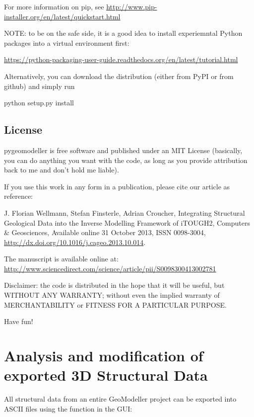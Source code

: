 \documentclass[letterpaper,10pt,english]{sphinxmanual}
\begin{document}
For more information on pip, see
\href{http://www.pip-installer.org/en/latest/quickstart.html}{http://www.pip-installer.org/en/latest/quickstart.html}

NOTE: to be on the safe side, it is a good idea to install experiemntal
Python packages into a virtual environment first:

\href{https://python-packaging-user-guide.readthedocs.org/en/latest/tutorial.html}{https://python-packaging-user-guide.readthedocs.org/en/latest/tutorial.html}

Alternatively, you can download the distribution (either from PyPI or
from github) and simply run

python setup.py install


\section{License}
\label{readme:license}
pygeomodeller is free software and published under an MIT License
(basically, you can do anything you want with the code, as long as you
provide attribution back to me and don't hold me liable).

If you use this work in any form in a publication, please cite our
article as reference:

J. Florian Wellmann, Stefan Finsterle, Adrian Croucher, Integrating
Structural Geological Data into the Inverse Modelling Framework of
iTOUGH2, Computers \& Geosciences, Available online 31 October 2013, ISSN
0098-3004, \href{http://dx.doi.org/10.1016/j.cageo.2013.10.014}{http://dx.doi.org/10.1016/j.cageo.2013.10.014}.

The manuscript is available online at:
\href{http://www.sciencedirect.com/science/article/pii/S0098300413002781}{http://www.sciencedirect.com/science/article/pii/S0098300413002781}

Disclaimer: the code is distributed in the hope that it will be useful,
but WITHOUT ANY WARRANTY; without even the implied warranty of
MERCHANTABILITY or FITNESS FOR A PARTICULAR PURPOSE.

Have fun!


\chapter{Analysis and modification of exported 3D Structural Data}
\label{3D-Structural-Data::doc}\label{3D-Structural-Data:analysis-and-modification-of-exported-3d-structural-data}
All structural data from an entire GeoModeller project can be exported
into ASCII files using the function in the GUI:
\end{document}
